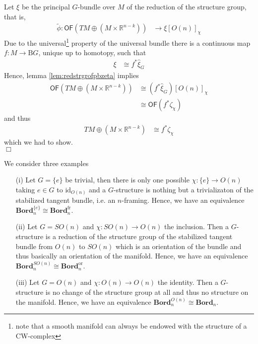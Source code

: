 \begin{prf}
Let $\xi$ be the principal $G$-bundle over $M$ of the reduction of the structure group, that is,
\begin{align*}
  \tilde{\phi}
  \colon
  \mathsf{OF}
  \left(
    TM
    \oplus
    (M \times \mathbb{R}^{n-k})
  \right)
  &\to
  \xi[O(n)]_{\chi}
\end{align*}
Due to the universal\footnote{note that a smooth manifold can always be endowed with the structure of a CW-complex} property of the universal bundle there is a continuous map $f \colon M \to \mathrm{B}G$, unique up to homotopy, such that
\begin{align*}
  \xi
  &\cong
  f^{\ast}\hat{\xi}_{G}
\end{align*}
Hence, lemma \ref{lem:redstrgrofpbzeta} implies
\begin{align*}
  \mathsf{OF}
  \left(
    TM
    \oplus
    (M \times \mathbb{R}^{n-k})
  \right)
  &\cong
  \left(
    f^{\ast}\hat{\xi}_{G}
  \right)
  [O(n)]_{\chi}
  \\
  &\cong
  \mathsf{OF}
  \left(
    f^{\ast}\zeta_{\chi}
  \right)
\end{align*}
and thus
\begin{align*}
  TM
  \oplus
  (M \times \mathbb{R}^{n-k})
  &\cong
  f^{\ast}\zeta_{\chi}
\end{align*}
which we had to show.
\\
\phantom{proven}
\hfill
$\Box$
\end{prf}
\begin{exa}
\label{exa:gstruct}
We consider three examples
\begin{enumerate}
\item[(i)]
Let $G = \lbrace e \rbrace$ be trivial, then there is only one possible $\chi \colon \lbrace e \rbrace \to O(n)$ taking $e \in G$ to $\mathrm{id}_{O(n)}$ and a $G$-structure is nothing but a trivializaton of the stabilized tangent bundle, i.e. an $n$-framing. Hence, we have an equivalence $\mathbf{Bord}_{n}^{\lbrace e \rbrace} \cong \mathbf{Bord}_{n}^{\mathrm{fr}}$.

\item[(ii)]
Let $G = SO(n)$ and $\chi \colon SO(n) \to O(n)$ the inclusion. Then a $G$-structure is a reduction of the structure group of the stabilized tangent bundle from $O(n)$ to $SO(n)$ which is an orientation of the bundle and thus basically an orientation of the manifold. Hence, we have an equivalence $\mathbf{Bord}_{n}^{SO(n)} \cong \mathbf{Bord}_{n}^{\mathrm{or}}$.

\item[(iii)]
Let $G = O(n)$ and $\chi \colon O(n) \to O(n)$ the identity. Then a $G$-structure is no change of the structure group at all and thus no structure on the manifold. Hence, we have an equivalence $\mathbf{Bord}_{n}^{O(n)} \cong \mathbf{Bord}_{n}$.
\end{enumerate}
\end{exa}
